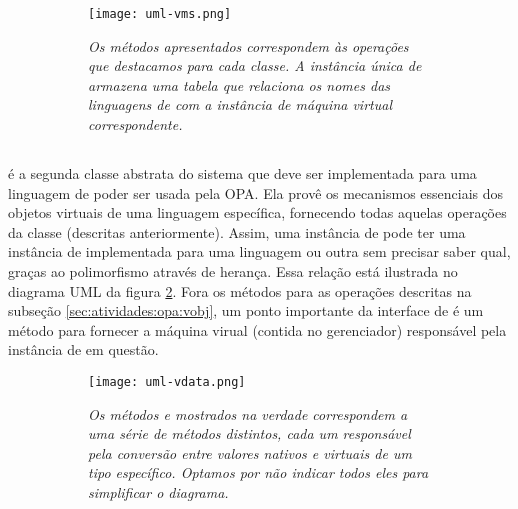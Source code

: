   \begin{figure}[ht]
    \centering
    \caption{}
    \begin{subfigure}{.8\textwidth}
      \begin{center}
        \texttt{[image: uml-vms.png]}
        \vspace{1em}

        \textit{
          Os métodos apresentados correspondem às operações que destacamos para
          cada classe. A instância única de \SMgr{} armazena uma tabela que
          relaciona os nomes das linguagens de \script{} com a instância de
          máquina virtual correspondente.
        }
      \end{center}
    \end{subfigure}
    \label{fig:uml-vms}
  \end{figure}
  
  \subsection{\VData{}}
  \label{sec:atividades:opa:vdata}
  \VData{} é a segunda classe abstrata do sistema que deve ser implementada para uma linguagem
  de \script{} poder ser usada pela OPA. Ela provê os mecanismos essenciais dos objetos virtuais
  de uma linguagem específica, fornecendo todas aquelas
  operações da classe \VObj{} (descritas anteriormente). Assim, uma instância
  de \VObj{} pode ter uma instância de \VData{} implementada para uma linguagem 
  ou outra sem precisar saber qual, graças ao polimorfismo através de herança. Essa relação
  está ilustrada no diagrama UML da figura \ref{fig:uml-vdata}. Fora os métodos para as
  operações descritas na subseção \ref{sec:atividades:opa:vobj}, um ponto importante da
  interface de \VData{} é um método para fornecer a máquina virual (contida no gerenciador)
  responsável pela instância de \VData{} em questão.

  \begin{figure}[ht]
    \centering
    \caption{}
    \begin{subfigure}{.8\textwidth}
      \begin{center}
        \texttt{[image: uml-vdata.png]}
        \vspace{1em}

        \textit{
          Os métodos  e  mostrados na verdade correspondem
          a uma série de métodos distintos, cada um responsável pela conversão entre
          valores nativos e virtuais de um tipo específico. Optamos por não indicar
          todos eles para simplificar o diagrama.
        }
      \end{center}
    \end{subfigure}
    \label{fig:uml-vdata}
  \end{figure}
  
